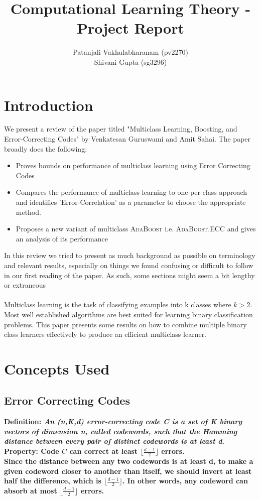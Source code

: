 \documentclass[11pt]{article}
\title{Computational Learning Theory - Project Report}
\author{Patanjali Vakhulabharanam (pv2270)\\ Shivani Gupta (sg3296)}
\begin{document}
\maketitle
\tableofcontents
\newpage
\section{Introduction}
    We present a review of the paper \cite{Guruswami:1999:MLB:307400.307429} titled "Multiclass Learning, Boosting, and Error-Correcting Codes" by Venkatesan Guruswami and Amit Sahai. The paper broadly does the following:
    \begin{itemize}
    \item Proves bounds on performance of multiclass learning using Error Correcting Codes
    \item Compares the performance of multiclass learning to one-per-class approach and identifies 'Error-Correlation' as a parameter to choose the appropriate method.
    \item Proposes a new variant of multiclass \textsc{AdaBoost} i.e. \textsc{AdaBoost}.ECC and gives an analysis of its performance
    \end{itemize}
    In this review we tried to present as much background as possible on terminology and relevant results, especially on things we found confusing or difficult to follow in our first reading of the paper. As such, some sections might seem a bit lengthy or extraneous\\\\
	Multiclass learning is the task of classifying examples into k classes where $k > 2$. Most well established algorithms are best suited for learning binary classification problems. This paper presents some results on how to combine  multiple binary class learners effectively to produce an efficient multiclass learner.
	
\section{Concepts Used}
    \subsection{Error Correcting Codes}
        \bf Definition: \normalfont \textit {An (n,K,d) error-correcting code C is a set of K binary vectors of dimension n, called codewords, such that the Hamming distance between every pair of distinct codewords is at least d}.\\
        \bf Property: Code $C$ can correct at least $\lfloor \frac{d-1}{2} \rfloor$ errors. \normalfont\\
        Since the distance between any two codewords is at least d, to make a given codeword closer to another than itself, we should invert at least half the difference, which is $\lfloor \frac{d-1}{2} \rfloor$. In other words, any codeword can absorb at most  $\lfloor \frac{d-1}{2} \rfloor$ errors.\\
\end{document}
